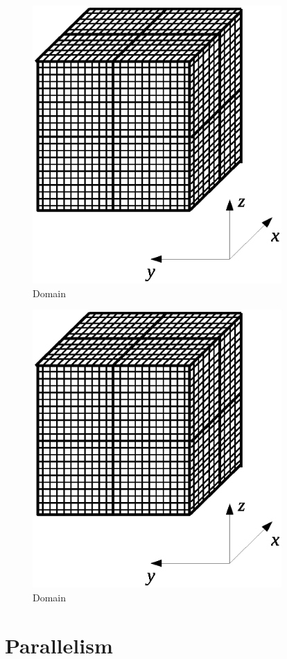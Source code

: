 \documentclass{report}
\begin{document}
\begin{figure}[h]
\begin{center}
\includegraphics[trim={{100pt} {150pt} {100pt} {150pt}}, clip, height=300pt]{img/domain.eps}
\end{center}
\caption{Domain}
\label{fig:domain}
\end{figure}




\begin{figure}[h]
\begin{center}
\includegraphics[trim={{100pt} {150pt} {100pt} {150pt}}, clip, height=300pt]{img/domain.eps}
\end{center}
\caption{Domain}
\label{fig:domain}
\end{figure}




\section{Parallelism}


\section{}
\end{document}
